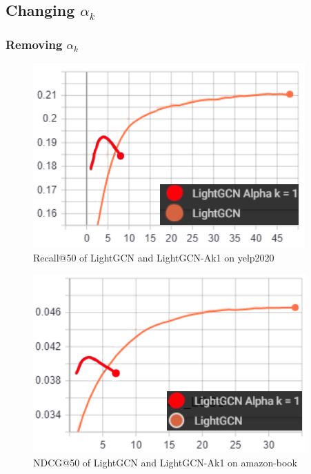 \subsection{Changing $\alpha_k$}

\subsubsection{Removing $\alpha_k$}\label{app:removing-alpha-k}
\begin{figure}
    \includegraphics[width=\linewidth]{figures/alpha-k-results/yelp2020-recall.png}
    \caption{Recall@50 of LightGCN and LightGCN-Ak1 on yelp2020}
    \label{fig:recall-yelp2020-alpha-k}
\end{figure}
\begin{figure}
    \includegraphics[width=\linewidth]{figures/alpha-k-results/amazon-ndcg.png}
    \caption{NDCG@50 of LightGCN and LightGCN-Ak1 on amazon-book}
    \label{fig:ndcg-amazon-alpha-k}
\end{figure}
